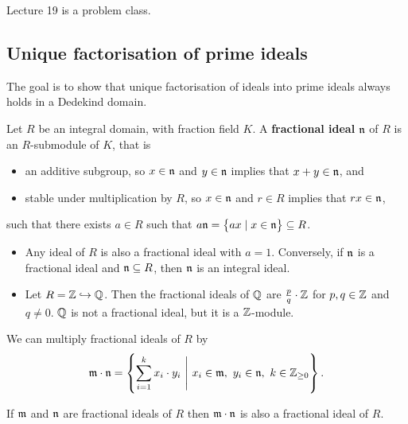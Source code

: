 
Lecture 19 is a problem class.


\subsection{Unique factorisation of prime ideals}

The goal is to show that unique factorisation of ideals into prime ideals always holds in a Dedekind domain.

\begin{definition}
Let $ R $ be an integral domain, with fraction field $ K $. A \textbf{fractional ideal} $ \mathfrak{n} $ of $ R $ is an $ R $-submodule of $ K $, that is
\begin{itemize}
\item an additive subgroup, so $ x \in \mathfrak{n} $ and $ y \in \mathfrak{n} $ implies that $ x + y \in \mathfrak{n} $, and
\item stable under multiplication by $ R $, so $ x \in \mathfrak{n} $ and $ r \in R $ implies that $ rx \in \mathfrak{n} $,
\end{itemize}
such that there exists $ a \in R $ such that $ a\nn = \cbr{ax \mid x \in \nn} \subseteq R $.
\end{definition}

\begin{example*}
\hfill
\begin{itemize}
\item Any ideal of $ R $ is also a fractional ideal with $ a = 1 $. Conversely, if $ \mathfrak{n} $ is a fractional ideal and $ \mathfrak{n} \subseteq R $, then $ \mathfrak{n} $ is an integral ideal.
\item Let $ R = \mathbb{Z} \hookrightarrow \mathbb{Q} $. Then the fractional ideals of $ \mathbb{Q} $ are $ \tfrac{p}{q} \cdot \mathbb{Z} $ for $ p, q \in \mathbb{Z} $ and $ q \ne 0 $. $ \mathbb{Q} $ is not a fractional ideal, but it is a $ \mathbb{Z} $-module.
\end{itemize}
\end{example*}

\pagebreak

We can multiply fractional ideals of $ R $ by
$$ \mm \cdot \nn = \cbr{\sum_{i = 1}^k x_i \cdot y_i \ \Bigg| \ x_i \in \mm, \ y_i \in \nn, \ k \in \Z_{\ge 0}}. $$

\begin{lemma}
If $ \mathfrak{m} $ and $ \mathfrak{n} $ are fractional ideals of $ R $ then $ \mathfrak{m} \cdot \mathfrak{n} $ is also a fractional ideal of $ R $.
\end{lemma}

